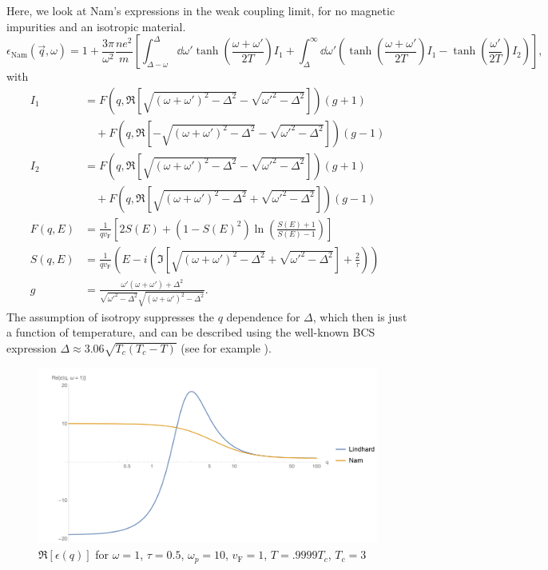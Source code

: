 \documentclass[%
 preprint,
 amsmath,amssymb,
 aps,
]{revtex4-2}
\newcommand{\vf}{v_{\mathrm{F}}}
\begin{document}
Here, we look at Nam's expressions in the weak coupling limit, for no magnetic impurities and an isotropic material.
\begin{equation}
	\epsilon_{\mathrm{Nam}}(\vec{q}, \omega) = 1 + \frac{3 \pi}{\omega^2} \frac{n e^2}{m} \left[\int_{\Delta - \omega}^{\Delta}\dd{\omega'} \tanh(\frac{\omega + \omega'}{2 T}) I_1 + \int_{\Delta}^{\infty} \dd{\omega'} \left( \tanh(\frac{\omega + \omega'}{2 T}) I_1  - \tanh(\frac{\omega'}{2 T})I_2 \right) \right], \label{eq:eps}
\end{equation}
with
\begin{align}
	I_1 &= F(q, \Re[\sqrt{(\omega + \omega')^2 - \Delta^2} - \sqrt{\omega'^2 - \Delta^2}]) (g + 1) \nonumber\\
	&\quad + F(q, \Re[-\sqrt{(\omega + \omega')^2 - \Delta^2} - \sqrt{\omega'^2 - \Delta^2}]) (g - 1) \\
	I_2 &= F(q, \Re[\sqrt{(\omega + \omega')^2 - \Delta^2} - \sqrt{\omega'^2 - \Delta^2}]) (g + 1) \nonumber\\
	&\quad + F(q, \Re[\sqrt{(\omega +  \omega')^2 - \Delta^2} + \sqrt{\omega'^2 - \Delta^2}]) (g - 1) \\
	F(q, E) &= \frac{1}{q \vf} \left[2 S(E) + (1 - S(E)^2)\ln(\frac{S(E) + 1}{S(E) - 1})\right] \label{eq:NamF} \\
	S(q, E) &= \frac{1}{q \vf} \left( E - i \left(\Im[\sqrt{(\omega + \omega')^2 - \Delta^2} + \sqrt{\omega'^2 - \Delta^2}] + \frac{2}{\tau} \right) \right) \\
	g &= \frac{\omega' \left(\omega + \omega'\right) + \Delta^2}{\sqrt{\omega'^2 - \Delta^2}\sqrt{(\omega + \omega')^2 - \Delta^2}}.
\end{align}
The assumption of isotropy suppresses the $q$ dependence for $\Delta$, which then is just a function of temperature, and can be described using the well-known BCS expression $\Delta \approx 3.06 \sqrt{T_c(T_c - T)}$ (see for example \cite{Tinkham}).

\begin{figure}[htp]
	\centering
	\includegraphics[width=\linewidth]{Cond1Re}
	\caption{$\Re[\epsilon(q)]$ for $\omega = 1$, $\tau = 0.5$, $\omega_p = 10$, $\vf = 1$, $T = .9999 T_c$, $T_c = 3$} \label{fig:cond1Re}
\end{figure}
\end{document}
